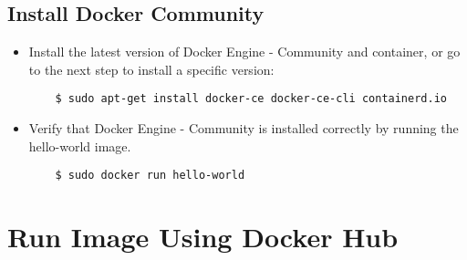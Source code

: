 \subsection{Install Docker Community}

\begin{itemize}
	
	\item Install the latest version of Docker Engine - Community and container, or go to the next step to install a specific version:
	\begin{verbatim}
	$ sudo apt-get install docker-ce docker-ce-cli containerd.io
	\end{verbatim}
	
	\item Verify that Docker Engine - Community is installed correctly by running the hello-world image.
	\begin{verbatim}
	$ sudo docker run hello-world
	\end{verbatim}
	
\end{itemize}


\section{Run Image Using Docker Hub}	

